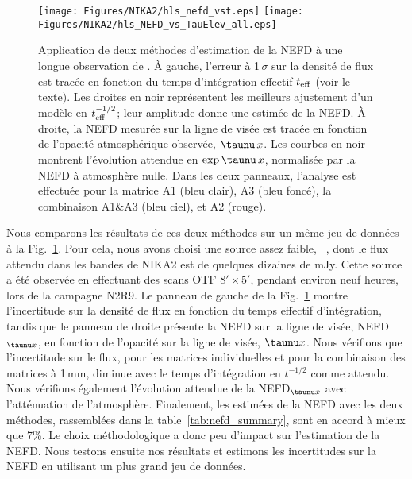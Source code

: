 \begin{figure}[!thbp]
  \begin{center}
    \texttt{[image: Figures/NIKA2/hls\_nefd\_vst.eps]}
    \texttt{[image: Figures/NIKA2/hls\_NEFD\_vs\_TauElev\_all.eps]}
    \caption{Application de deux méthodes d'estimation de la NEFD à
      une longue observation de \hls. \`A gauche, l'erreur à 1\,$\sigma$
      sur la densité de flux est tracée en fonction du temps
      d'intégration effectif $t_{\rm{eff}}$ (voir le texte). Les
      droites en noir représentent les meilleurs ajustement d'un
      modèle en $t_{\rm{eff}}^{-1/2}$; leur amplitude donne une
      estimée de la NEFD. \`A droite, la NEFD mesurée sur
      la ligne de visée est tracée en fonction de l'opacité
      atmosphérique observée, $\taunu\,x$. Les courbes en noir
      montrent l'évolution attendue en $\exp{\taunu\,x}$, normalisée
      par la NEFD à atmosphère nulle. Dans les deux panneaux,
      l'analyse est effectuée pour la matrice  A1 (bleu clair), A3
      (bleu foncé), la combinaison A1\&A3 (bleu ciel), et A2 (rouge).}
    \label{fig:nefd_twomethods}
  \end{center}
\end{figure}
%
Nous comparons les résultats de ces deux méthodes sur un même jeu de
données à la Fig.~\ref{fig:nefd_twomethods}.
Pour cela, nous avons choisi une source assez faible,
\hls~\citep{Combes2012}, dont le flux attendu dans les bandes de NIKA2
est de quelques dizaines de mJy. Cette source a été observée en
effectuant des scans OTF $8' \times 5'$, pendant environ neuf heures,
lors de la campagne N2R9. Le panneau de gauche de la
Fig.~\ref{fig:nefd_twomethods} montre l'incertitude sur la densité
de flux en fonction du temps effectif d'intégration,
tandis que le panneau de droite présente la NEFD sur la ligne de
visée, NEFD$_{\taunu x}$, en fonction de l'opacité sur la ligne de
visée, $\taunu x$. Nous vérifions que l'incertitude sur le flux, pour
les matrices individuelles et pour la combinaison des matrices à 1\,mm,
diminue avec le temps d'intégration en $t^{-1/2}$ comme attendu. Nous
vérifions également l'évolution attendue de la NEFD$_{\taunu x}$ avec
l'atténuation de l'atmosphère. Finalement, les
estimées de la NEFD avec les deux méthodes, rassemblées dans la
table~\ref{tab:nefd_summary}, sont en accord à mieux que 7\%. Le
choix méthodologique a donc peu d'impact sur l'estimation de la
NEFD. Nous testons ensuite nos résultats et estimons les incertitudes
sur la NEFD en utilisant un plus grand jeu de données.  

